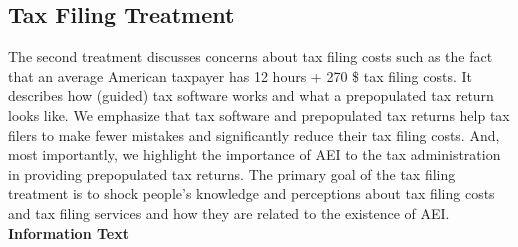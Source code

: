 \documentclass[12pt]{article}
\begin{document}
\subsection*{Tax Filing Treatment}
The second treatment discusses concerns about tax filing costs such as the fact that an average American taxpayer has 12 hours + 270 \$ tax filing costs. It describes how (guided) tax software works and what a prepopulated tax return looks like. We emphasize that tax software and prepopulated tax returns help tax filers to make fewer mistakes and significantly reduce their tax filing costs. And, most importantly, we highlight the importance of AEI to the tax administration in providing prepopulated tax returns. The primary goal of the tax filing treatment is to shock people's knowledge and perceptions about tax filing costs and tax filing services and how they are related to the existence of AEI.  \\[0.5em]
\textbf{Information Text}
\end{document}
